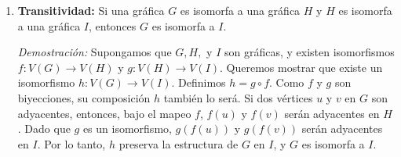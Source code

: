 \documentclass{article}
\begin{document}
\begin{enumerate}
    \begin{center}
    \end{center}

\item \textbf{Transitividad:} Si una gráfica \( G \) es isomorfa a una gráfica \( H \) y \( H \) es isomorfa a una gráfica \( I \), entonces \( G \) es isomorfa a \( I \).

    \textit{Demostración:}
    Supongamos que \( G, H, \) y \( I \) son gráficas, y existen isomorfismos \( f: V(G) \to V(H) \) y \( g: V(H) \to V(I) \). Queremos mostrar que existe un isomorfismo \( h: V(G) \to V(I) \). Definimos \( h = g \circ f \). Como \( f \) y \( g \) son biyecciones, su composición \( h \) también lo será. Si dos vértices \( u \) y \( v \) en \( G \) son adyacentes, entonces, bajo el mapeo \( f \), \( f(u) \) y \( f(v) \) serán adyacentes en \( H \). Dado que \( g \) es un isomorfismo, \( g(f(u)) \) y \( g(f(v)) \) serán adyacentes en \( I \). Por lo tanto, \( h \) preserva la estructura de \( G \) en \( I \), y \( G \) es isomorfa a \( I \).

    \begin{center}
    \end{center}


\end{enumerate}
\end{document}
